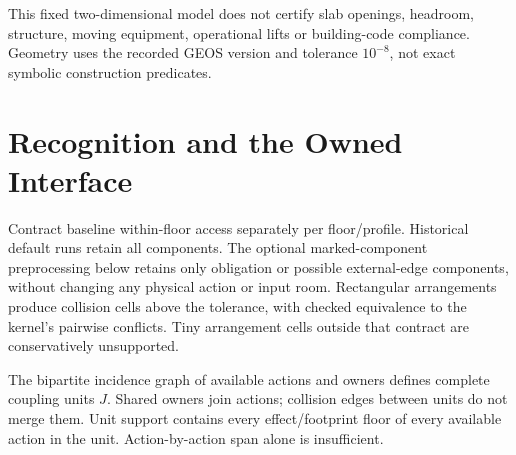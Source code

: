 \documentclass[conference]{IEEEtran}
\begin{document}
This fixed two-dimensional model does not certify slab openings, headroom, structure, moving equipment, operational lifts or building-code compliance. Geometry uses the recorded GEOS version and tolerance $10^{-8}$, not exact symbolic construction predicates.

\section{Recognition and the Owned Interface}
Contract baseline within-floor access separately per floor/profile. Historical default runs retain all components. The optional marked-component preprocessing below retains only obligation or possible external-edge components, without changing any physical action or input room. Rectangular arrangements produce collision cells above the tolerance, with checked equivalence to the kernel's pairwise conflicts. Tiny arrangement cells outside that contract are conservatively unsupported.

The bipartite incidence graph of available actions and owners defines complete coupling units $J$. Shared owners join actions; collision edges between units do not merge them. Unit support contains every effect/footprint floor of every available action in the unit. Action-by-action span alone is insufficient.
\end{document}
